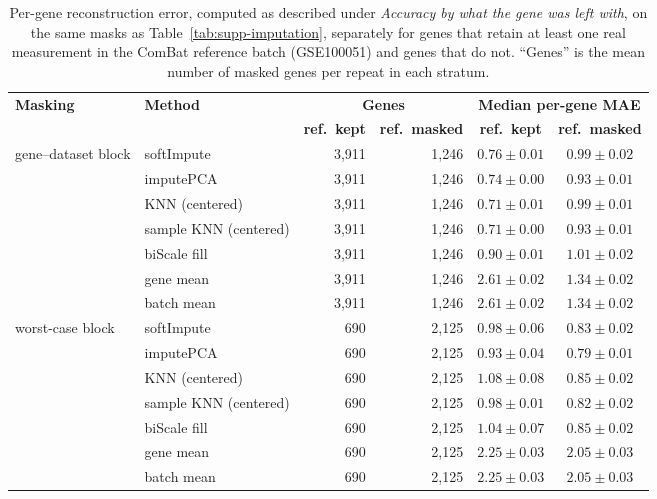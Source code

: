 \documentclass[11pt,a4paper]{article}
\begin{document}
\begin{table}[htbp]
\centering
\footnotesize
\begin{tabular}{@{}llrrcc@{}}
\toprule
\textbf{Masking} & \textbf{Method} & \multicolumn{2}{c}{\textbf{Genes}} & \multicolumn{2}{c}{\textbf{Median per-gene MAE}} \\
\cmidrule(lr){3-4}\cmidrule(lr){5-6}
 & & \textbf{ref.\ kept} & \textbf{ref.\ masked} & \textbf{ref.\ kept} & \textbf{ref.\ masked} \\
\midrule
gene--dataset block & softImpute & 3{,}911 & 1{,}246 & $0.76 \pm 0.01$ & $0.99 \pm 0.02$ \\
 & imputePCA & 3{,}911 & 1{,}246 & $0.74 \pm 0.00$ & $0.93 \pm 0.01$ \\
 & KNN (centered) & 3{,}911 & 1{,}246 & $0.71 \pm 0.01$ & $0.99 \pm 0.01$ \\
 & sample KNN (centered) & 3{,}911 & 1{,}246 & $0.71 \pm 0.00$ & $0.93 \pm 0.01$ \\
 & biScale fill & 3{,}911 & 1{,}246 & $0.90 \pm 0.01$ & $1.01 \pm 0.02$ \\
 & gene mean & 3{,}911 & 1{,}246 & $2.61 \pm 0.02$ & $1.34 \pm 0.02$ \\
 & batch mean & 3{,}911 & 1{,}246 & $2.61 \pm 0.02$ & $1.34 \pm 0.02$ \\
\addlinespace
worst-case block & softImpute & 690 & 2{,}125 & $0.98 \pm 0.06$ & $0.83 \pm 0.02$ \\
 & imputePCA & 690 & 2{,}125 & $0.93 \pm 0.04$ & $0.79 \pm 0.01$ \\
 & KNN (centered) & 690 & 2{,}125 & $1.08 \pm 0.08$ & $0.85 \pm 0.02$ \\
 & sample KNN (centered) & 690 & 2{,}125 & $0.98 \pm 0.01$ & $0.82 \pm 0.02$ \\
 & biScale fill & 690 & 2{,}125 & $1.04 \pm 0.07$ & $0.85 \pm 0.02$ \\
 & gene mean & 690 & 2{,}125 & $2.25 \pm 0.03$ & $2.05 \pm 0.03$ \\
 & batch mean & 690 & 2{,}125 & $2.25 \pm 0.03$ & $2.05 \pm 0.03$ \\
\bottomrule
\end{tabular}
\caption{Per-gene reconstruction error, computed as described
  under \emph{Accuracy by what the gene was left with}, on the same masks as
  Table~\ref{tab:supp-imputation}, separately for genes that
  retain at least one real measurement in the ComBat reference
  batch (GSE100051) and genes that do not. ``Genes'' is the
  mean number of masked genes per repeat in each stratum.}
\label{tab:supp-imputation-pergene}
\end{table}
\end{document}
